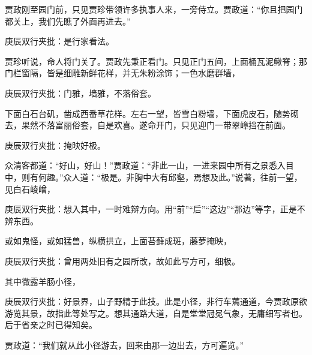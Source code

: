 \begin{parag}


    贾政刚至园门前，只见贾珍带领许多执事人来，一旁侍立。贾政道：“你且把园门都关上，我们先瞧了外面再进去。”\begin{note}庚辰双行夹批：是行家看法。\end{note}贾珍听说，命人将门关了。贾政先秉正看门。只见正门五间，上面桶瓦泥鳅脊；那门栏窗隔，皆是细雕新鲜花样，并无朱粉涂饰；一色水磨群墙，\begin{note}庚辰双行夹批：门雅，墙雅，不落俗套。\end{note}下面白石台矶，凿成西番草花样。左右一望，皆雪白粉墙，下面虎皮石，随势砌去，果然不落富丽俗套，自是欢喜。遂命开门，只见迎门一带翠嶂挡在前面。\begin{note}庚辰双行夹批：掩映好极。\end{note}众清客都道：“好山，好山！”贾政道：“非此一山，一进来园中所有之景悉入目中，则有何趣。”众人道：“极是。非胸中大有邱壑，焉想及此。”说著，往前一望，见白石崚嶒，\begin{note}庚辰双行夹批：想入其中，一时难辩方向。用“前”“后”“这边”“那边”等字，正是不辨东西。\end{note}或如鬼怪，或如猛兽，纵横拱立，上面苔藓成斑，藤萝掩映，\begin{note}庚辰双行夹批：曾用两处旧有之园所改，故如此写方可，细极。\end{note}其中微露羊肠小径，\begin{note}庚辰双行夹批：好景界，山子野精于此技。此是小径，非行车蔫通道，今贾政原欲游览其景，故指此等处写之。想其通路大道，自是堂堂冠冕气象，无庸细写者也。后于省亲之时已得知矣。\end{note}贾政道：“我们就从此小径游去，回来由那一边出去，方可遍览。”
\end{parag}


